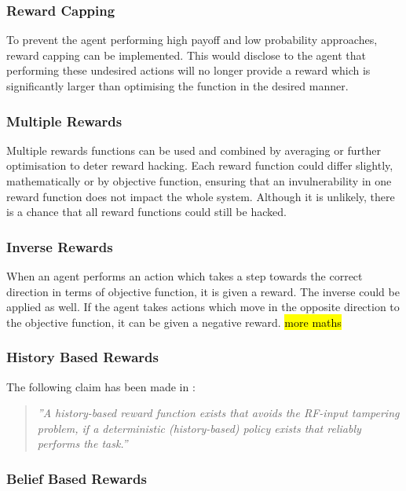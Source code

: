 \subsubsection{Reward Capping}
To prevent the agent performing high payoff and low probability approaches, reward capping can be implemented.
This would disclose to the agent that performing these undesired actions will no longer provide a reward which is significantly larger than optimising the function in the desired manner.

\subsubsection{Multiple Rewards}
Multiple rewards functions can be used and combined by averaging or further optimisation to deter reward hacking.
Each reward function could differ slightly, mathematically or by objective function, ensuring that an invulnerability in one reward function does not impact the whole system.
Although it is unlikely, there is a chance that all reward functions could still be hacked.

\subsubsection{Inverse Rewards}
When an agent performs an action which takes a step towards the correct direction in terms of objective function, it is given a reward.
The inverse could be applied as well. If the agent takes actions which move in the opposite direction to the objective function, it can be given a negative reward.
\hl{more maths}

\subsubsection{History Based Rewards}
The following claim has been made in \cite{DBLP:journals/corr/abs-1908-04734}:
\begin{quote}
    \emph{''A history-based reward function exists that avoids the RF-input tampering
    problem, if a deterministic (history-based) policy exists that reliably performs the task.''}
\end{quote}

\subsubsection{Belief Based Rewards}

